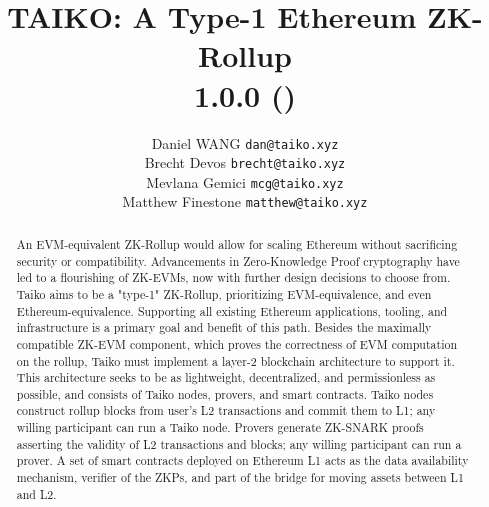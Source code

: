 \documentclass[9pt,oneside]{amsart}
\title[TAIKO: A Type-1 Ethereum ZK-Rollup\\ \smaller
\textbf{{1.0.0}}]{TAIKO: A Type-1 Ethereum ZK-Rollup \\ \smaller \textbf{{1.0.0 (\thedate)}}}
\author{
  Daniel WANG \texttt{dan@taiko.xyz} \\
  Brecht Devos \texttt{brecht@taiko.xyz}\\
  Mevlana Gemici \texttt{mcg@taiko.xyz} \\
  Matthew Finestone \texttt{matthew@taiko.xyz}
}
\begin{document}
\pagecolor{pagecolor}

\begin{abstract}
An EVM-equivalent ZK-Rollup would allow for scaling Ethereum without sacrificing security or compatibility. Advancements in Zero-Knowledge Proof cryptography have led to a flourishing of ZK-EVMs, now with further design decisions to choose from. Taiko aims to be a "type-1" ZK-Rollup, prioritizing EVM-equivalence, and even Ethereum-equivalence. Supporting all existing Ethereum applications, tooling, and infrastructure is a primary goal and benefit of this path. Besides the maximally compatible ZK-EVM component, which proves the correctness of EVM computation on the rollup, Taiko must implement a layer-2 blockchain architecture to support it. This architecture seeks to be as lightweight, decentralized, and permissionless as possible, and consists of Taiko nodes, provers, and smart contracts. Taiko nodes construct rollup blocks from user’s L2 transactions and commit them to L1; any willing participant can run a Taiko node. Provers generate ZK-SNARK proofs asserting the validity of L2 transactions and blocks; any willing participant can run a prover. A set of smart contracts deployed on Ethereum L1 acts as the data availability mechanism, verifier of the ZKPs, and part of the bridge for moving assets between L1 and L2. 

\end{abstract}

\maketitle
\end{document}
